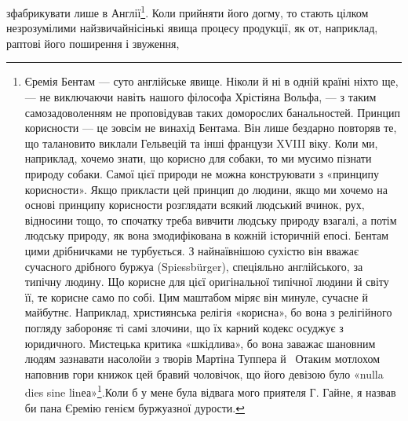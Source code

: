 зфабрикувати лише в Англії\footnote{
Єремія Бентам — суто англійське явище. Ніколи й ні в одній
країні ніхто ще, — не виключаючи навіть нашого філософа Хрістіяна
Вольфа, — з таким самозадоволенням не проповідував таких доморослих
банальностей. Принцип корисности — це зовсім не винахід Бентама.
Він лише бездарно повторяв те, що талановито виклали Гельвецій та
інші французи XVIII віку. Коли ми, наприклад, хочемо знати, що корисно
для собаки, то ми мусимо пізнати природу собаки. Самої цієї природи
не можна конструювати з «принципу корисности». Якщо прикласти
цей принцип до людини, якщо ми хочемо на основі принципу корисности
розглядати всякий людський вчинок, рух, відносини тощо,
то спочатку треба вивчити людську природу взагалі, а потім людську
природу, як вона змодифікована в кожній історичній епосі. Бентам цими
дрібничками не турбується. З найнаївнішою сухістю він вважає сучасного
дрібного буржуа (Spiessbürger), спеціяльно англійського, за типічну
людину. Що корисне для цієї оригінальної типічної людини й світу її,
те корисне само по собі. Цим маштабом міряє він минуле, сучасне й майбутнє.
Наприклад, християнська релігія «корисна», бо вона з релігійного
погляду забороняє ті самі злочини, що їх карний кодекс осуджує з
юридичного. Мистецька критика «шкідлива», бо вона заважає шановним
людям зазнавати насолойи з творів Мартіна Туппера й~ Отаким мотлохом
наповнив гори книжок цей бравий чоловічок, що його девізою було
«nulla dies sine lіnеа»\footnote*{
— жодного дня без рядка. \emph{Ред.}
}.Коли б у мене була відвага мого приятеля Г. Гайне,
я назвав би пана Єремію генієм буржуазної дурости.
}. Коли прийняти його догму, то
стають цілком незрозумілими найзвичайнісінькі явища процесу
продукції, як от, наприклад, раптові його поширення і звуження,
\parbreak{}  %
